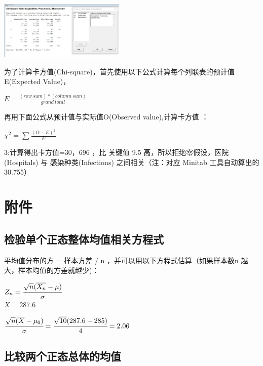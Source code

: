 \includegraphics[width=6cm]{6chiSquareTstResultScreenshot_2022-07-24_103606.jpg}


为了计算卡方值(Chi-square)，首先使用以下公式计算每个列联表的预计值E(Expected
Value)，

\(E = \frac{(row \ sum) * (column \ sum)} {grand \ total}\)

再用下面公式从预计值与实际值O(Observed value),计算卡方值 ：

\(\chi ^2 = \sum \frac{(O - E)^2} {E}\)

3:计算得出卡方值=30，696 ，比 关键值 9.5 高，所以拒绝零假设，医院(Hospitals)
与 感染种类(Infections) 之间相关（注：对应 Minitab 工具自动算出的 30.755）\\

\hypertarget{ux9644ux4ef6}{%
\section{附件}\label{ux9644ux4ef6}}

\hypertarget{ux68c0ux9a8cux5355ux4e2aux6b63ux6001ux6574ux4f53ux5747ux503cux76f8ux5173ux65b9ux7a0bux5f0f}{%
\subsection{检验单个正态整体均值相关方程式}\label{ux68c0ux9a8cux5355ux4e2aux6b63ux6001ux6574ux4f53ux5747ux503cux76f8ux5173ux65b9ux7a0bux5f0f}}

平均值分布的方 = 样本方差 / n ，并可以用以下方程式估算（如果样本数n
越大，样本均值的方差就越少)：

\(Z_n = \cfrac{ \sqrt{n}(\overline{X_n} - \mu) }{\sigma}\)\\

\(\overline{X} = 287.6\)

\(\cfrac{ \sqrt{n}(\overline{X} - \mu_0) }{\sigma} = \cfrac{ \sqrt{10}( 287.6 - 285 ) }{4} = 2.06\)\\

\hypertarget{ux6bd4ux8f83ux4e24ux4e2aux6b63ux6001ux603bux4f53ux7684ux5747ux503c-1}{%
\subsection{比较两个正态总体的均值}\label{ux6bd4ux8f83ux4e24ux4e2aux6b63ux6001ux603bux4f53ux7684ux5747ux503c-1}}


